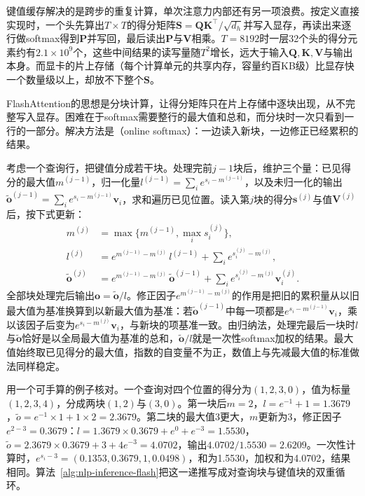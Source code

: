 键值缓存解决的是跨步的重复计算，单次注意力内部还有另一项浪费。按定义直接实现时，一个头先算出$T\times T$的得分矩阵$\bm S=\bm Q\bm K^{\top}/\sqrt{d_h}$并写入显存，再读出来逐行做softmax得到$\bm P$并写回，最后读出$\bm P$与$\bm V$相乘。$T=8192$时一层32个头的得分元素约有$2.1\times10^9$个，这些中间结果的读写量随$T^2$增长，远大于输入$\bm Q,\bm K,\bm V$与输出本身。而显卡的片上存储（每个计算单元的共享内存，容量约百KB级）比显存快一个数量级以上，却放不下整个$\bm S$。

FlashAttention的思想是分块计算，让得分矩阵只在片上存储中逐块出现，从不完整写入显存。困难在于softmax需要整行的最大值和总和，而分块时一次只看到一行的一部分。解决方法是（online softmax）：一边读入新块，一边修正已经累积的结果。

考虑一个查询行，把键值分成若干块。处理完前$j-1$块后，维护三个量：已见得分的最大值$m^{(j-1)}$，归一化量$l^{(j-1)}=\sum_i e^{s_i-m^{(j-1)}}$，以及未归一化的输出$\tilde{\bm o}^{(j-1)}=\sum_ie^{s_i-m^{(j-1)}}\bm v_i$，求和遍历已见位置。读入第$j$块的得分$\bm s^{(j)}$与值$\bm V^{(j)}$后，按下式更新：
\begin{equation}
 \begin{aligned}
  m^{(j)}&=\max\bigl\{m^{(j-1)},\max_i s^{(j)}_i\bigr\},\\
  l^{(j)}&=e^{m^{(j-1)}-m^{(j)}}\,l^{(j-1)}+\sum_i e^{s^{(j)}_i-m^{(j)}},\\
  \tilde{\bm o}^{(j)}&=e^{m^{(j-1)}-m^{(j)}}\,\tilde{\bm o}^{(j-1)}+\sum_i e^{s^{(j)}_i-m^{(j)}}\bm v^{(j)}_i .
 \end{aligned}
 \label{eq:nlp-inference-online-softmax}
\end{equation}
全部块处理完后输出$\bm o=\tilde{\bm o}/l$。修正因子$e^{m^{(j-1)}-m^{(j)}}$的作用是把旧的累积量从以旧最大值为基准换算到以新最大值为基准：若$\tilde{\bm o}^{(j-1)}$中每一项都是$e^{s_i-m^{(j-1)}}\bm v_i$，乘以该因子后变为$e^{s_i-m^{(j)}}\bm v_i$，与新块的项基准一致。由归纳法，处理完最后一块时$l$与$\tilde{\bm o}$恰好是以全局最大值为基准的总和，$\tilde{\bm o}/l$就是一次性softmax加权的结果。最大值始终取已见得分的最大值，指数的自变量不为正，数值上与先减最大值的标准做法同样稳定。

用一个可手算的例子核对。一个查询对四个位置的得分为$(1,2,3,0)$，值为标量$(1,2,3,4)$，分成两块$(1,2)$与$(3,0)$。第一块后$m=2$，$l=e^{-1}+1=1.3679$，$\tilde o=e^{-1}\times1+1\times2=2.3679$。第二块的最大值3更大，$m$更新为3，修正因子$e^{2-3}=0.3679$：$l=1.3679\times0.3679+e^{0}+e^{-3}=1.5530$，$\tilde o=2.3679\times0.3679+3+4e^{-3}=4.0702$，输出$4.0702/1.5530=2.6209$。一次性计算时，$e^{s_i-3}=(0.1353,0.3679,1,0.0498)$，和为1.5530，加权和为4.0702，结果相同。算法~\ref{alg:nlp-inference-flash}把这一递推写成对查询块与键值块的双重循环。

